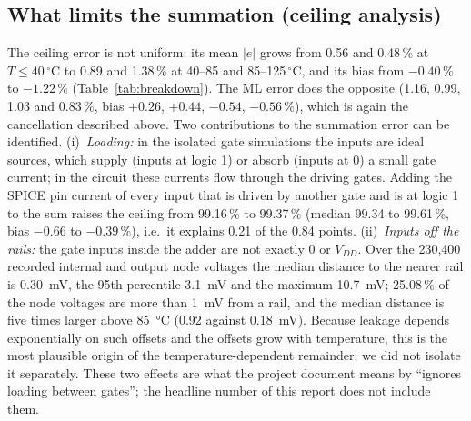 \subsection{What limits the summation (ceiling analysis)}\label{sec:circuit:ceiling}
The ceiling error is not uniform: its mean $|e|$ grows from 0.56 and 0.48\,\% at $T\le40\,^\circ$C to 0.89 and 1.38\,\% at 40--85 and 85--125\,$^\circ$C, and its bias from $-0.40\,\%$ to $-1.22\,\%$ (Table~\ref{tab:breakdown}). The ML error does the opposite (1.16, 0.99, 1.03 and 0.83\,\%, bias $+0.26$, $+0.44$, $-0.54$, $-0.56\,\%$), which is again the cancellation described above.
Two contributions to the summation error can be identified. (i)~\emph{Loading:} in the isolated gate simulations the inputs are ideal sources, which supply (inputs at logic 1) or absorb (inputs at 0) a small gate current; in the circuit these currents flow through the driving gates. Adding the SPICE pin current of every input that is driven by another gate and is at logic 1 to the sum raises the ceiling from 99.16\,\% to 99.37\,\% (median 99.34 to 99.61\,\%, bias $-0.66$ to $-0.39\,\%$), i.e.\ it explains 0.21 of the 0.84 points. (ii)~\emph{Inputs off the rails:} the gate inputs inside the adder are not exactly 0 or $V_{DD}$. Over the 230,400 recorded internal and output node voltages the median distance to the nearer rail is \SI{0.30}{\milli\volt}, the 95th percentile \SI{3.1}{\milli\volt} and the maximum \SI{10.7}{\milli\volt}; 25.08\,\% of the node voltages are more than \SI{1}{\milli\volt} from a rail, and the median distance is five times larger above \SI{85}{\celsius} (0.92 against \SI{0.18}{\milli\volt}). Because leakage depends exponentially on such offsets and the offsets grow with temperature, this is the most plausible origin of the temperature-dependent remainder; we did not isolate it separately.
These two effects are what the project document means by ``ignores loading between gates''; the headline number of this report does not include them.
